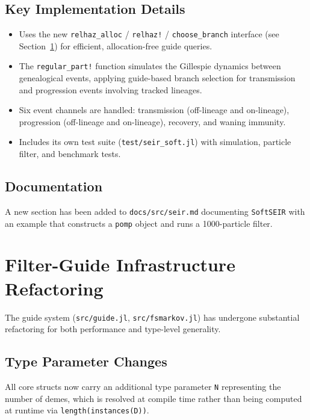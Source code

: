 \documentclass[11pt,letterpaper]{article}
\begin{document}
\subsection{Key Implementation Details}

\begin{itemize}
  \item Uses the new \texttt{relhaz\_alloc} / \texttt{relhaz!} /
        \texttt{choose\_branch} interface (see Section~\ref{sec:guide})
        for efficient, allocation-free guide queries.
  \item The \texttt{regular\_part!} function simulates the Gillespie
        dynamics between genealogical events, applying guide-based
        branch selection for transmission and progression events
        involving tracked lineages.
  \item Six event channels are handled: transmission (off-lineage and
        on-lineage), progression (off-lineage and on-lineage), recovery,
        and waning immunity.
  \item Includes its own test suite (\texttt{test/seir\_soft.jl}) with
        simulation, particle filter, and benchmark tests.
\end{itemize}

\subsection{Documentation}

A new section has been added to \texttt{docs/src/seir.md} documenting
\texttt{SoftSEIR} with an example that constructs a \texttt{pomp}
object and runs a 1000-particle filter.

\section{Filter-Guide Infrastructure Refactoring}
\label{sec:guide}

The guide system (\texttt{src/guide.jl}, \texttt{src/fsmarkov.jl}) has
undergone substantial refactoring for both performance and type-level
generality.

\subsection{Type Parameter Changes}

All core structs now carry an additional type parameter \texttt{N}
representing the number of demes, which is resolved at compile time
rather than being computed at runtime via
\texttt{length(instances(D))}.
\end{document}
